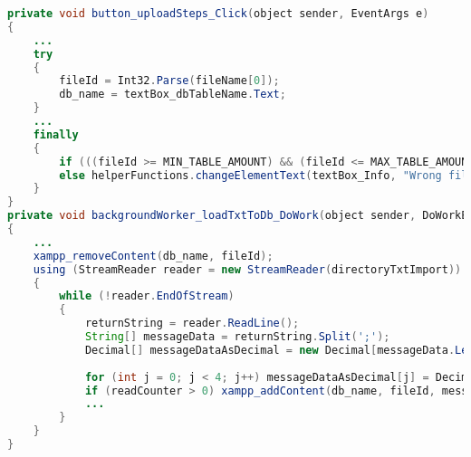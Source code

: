 \label{lst:uploadSteps}
\begin{lstlisting}[language=Java, caption=Schrittfolge auslagern]
private void button_uploadSteps_Click(object sender, EventArgs e)
{
	...	
	try
	{
		fileId = Int32.Parse(fileName[0]);
		db_name = textBox_dbTableName.Text;
	}
	...
	finally
	{
		if (((fileId >= MIN_TABLE_AMOUNT) && (fileId <= MAX_TABLE_AMOUNT)) && (db_name.Length != 0)) backgroundWorker_loadTxtToDb.RunWorkerAsync();
		else helperFunctions.changeElementText(textBox_Info, "Wrong file id or db name", true);
	}
}
private void backgroundWorker_loadTxtToDb_DoWork(object sender, DoWorkEventArgs e)
{
	...
	xampp_removeContent(db_name, fileId);
	using (StreamReader reader = new StreamReader(directoryTxtImport))
	{
		while (!reader.EndOfStream)
		{
			returnString = reader.ReadLine();
			String[] messageData = returnString.Split(';');
			Decimal[] messageDataAsDecimal = new Decimal[messageData.Length];
			
			for (int j = 0; j < 4; j++) messageDataAsDecimal[j] = Decimal.Parse(messageData[j], CultureInfo.InvariantCulture.NumberFormat);
			if (readCounter > 0) xampp_addContent(db_name, fileId, messageDataAsDecimal);
			...
		}
	}
}
\end{lstlisting}